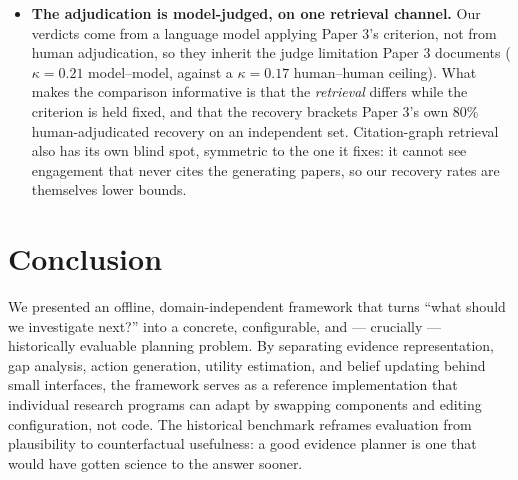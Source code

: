 \documentclass[11pt]{article}
\begin{document}
\begin{itemize}
  Section~\ref{sec:adjudication} measures $69$--$94\%$ under-counting
  on the high-specificity stratum. Any result computed on this label
  that correlates with question specificity is suspect by default,
  which is why the neglect interpretation is withdrawn rather than
  hedged. Adjudicating the remaining $312$ tension questions would
  extend the bound beyond the one stratum where we measured it.
  \item \textbf{The adjudication is model-judged, on one retrieval
  channel.} Our verdicts come from a language model applying Paper 3's
  criterion, not from human adjudication, so they inherit the judge
  limitation Paper 3 documents ($\kappa = 0.21$ model--model, against a
  $\kappa = 0.17$ human--human ceiling). What makes the comparison
  informative is that the \emph{retrieval} differs while the criterion
  is held fixed, and that the recovery brackets Paper 3's own $80\%$
  human-adjudicated recovery on an independent set. Citation-graph
  retrieval also has its own blind spot, symmetric to the one it fixes:
  it cannot see engagement that never cites the generating papers, so
  our recovery rates are themselves lower bounds.
\end{itemize}

\section{Conclusion}

We presented an offline, domain-independent framework that turns ``what
should we investigate next?'' into a concrete, configurable, and ---
crucially --- historically evaluable planning problem. By separating
evidence representation, gap analysis, action generation, utility
estimation, and belief updating behind small interfaces, the framework
serves as a reference implementation that individual research programs
can adapt by swapping components and editing configuration, not code.
The historical benchmark reframes evaluation from plausibility to
counterfactual usefulness: a good evidence planner is one that would
have gotten science to the answer sooner.
\end{document}
